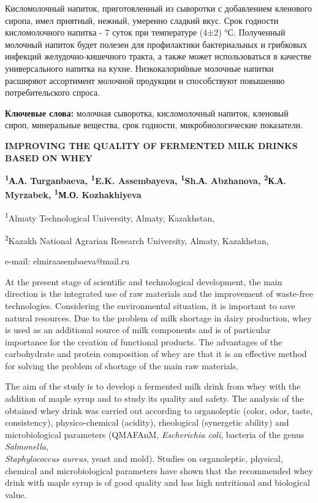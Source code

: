 Кисломолочный напиток, приготовленный из сыворотки с добавлением
кленового сиропа, имел приятный, нежный, умеренно сладкий вкус. Срок
годности кисломолочного напитка - 7 суток при температуре (4±2) °С.
Полученный молочный напиток будет полезен для профилактики бактериальных
и грибковых инфекций желудочно-кишечного тракта, а также может
использоваться в качестве универсального напитка на кухне.
Низкокалорийные молочные напитки расширяют ассортимент молочной
продукции и способствуют повышению потребительского спроса.

{\bfseries Ключевые слова:} молочная сыворотка, кисломолочный напиток,
кленовый сироп, минеральные вещества, срок годности, микробиологические
показатели.

\begin{articleheader}
{\bfseries IMPROVING THE QUALITY OF FERMENTED MILK DRINKS BASED ON WHEY}

{\bfseries
\textsuperscript{1}А.А. Turganbaeva,
\textsuperscript{1}E.K. Assembayeva\textsuperscript{\envelope },
\textsuperscript{1}Sh.А. Abzhanova,
\textsuperscript{2}К.А. Myrzabek,
\textsuperscript{1}М.О. Kozhakhiyeva}
\end{articleheader}

\begin{affiliation}
\textsuperscript{1}Almaty Technological University, Almaty, Kazakhstan,

\textsuperscript{2}Kazakh National Agrarian Research University, Almaty, Kazakhstan,

e-mail: elmiraasembaeva@mail.ru
\end{affiliation}

At the present stage of scientific and technological development, the
main direction is the integrated use of raw materials and the
improvement of waste-free technologies. Considering the environmental
situation, it is important to save natural resources. Due to the problem
of milk shortage in dairy production, whey is used as an additional
source of milk components and is of particular importance for the
creation of functional products. The advantages of the carbohydrate and
protein composition of whey are that it is an effective method for
solving the problem of shortage of the main raw materials.

The aim of the study is to develop a fermented milk drink from whey with
the addition of maple syrup and to study its quality and safety. The
analysis of the obtained whey drink was carried out according to
organoleptic (color, odor, taste, consistency), physico-chemical
(acidity), rheological (synergetic ability) and microbiological
parameters (QMAFAnM, \emph{Escherichia coli}, bacteria of the genus
\emph{Salmonella, \\Staphylococcus aureus}, yeast and mold). Studies on
organoleptic, physical, chemical and microbiological parameters have
shown that the recommended whey drink with maple syrup is of good
quality and has high nutritional and biological value.

